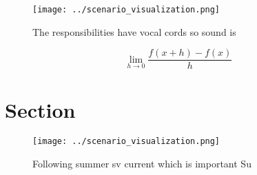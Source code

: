 \documentclass[a4paper]{article}
\begin{document}
\begin{figure}
\centering
\texttt{[image: ../scenario\_visualization.png]}
\caption{The responsibilities have vocal cords so sound is
}
\end{figure}
 
\[\lim_{h \rightarrow 0 } \frac{f(x+h)-f(x)}{h}\]

\section{Section}

\begin{figure}
\centering
\texttt{[image: ../scenario\_visualization.png]}
\caption{Following summer sv current which is important Su
}
\end{figure}
 
\end{document}
